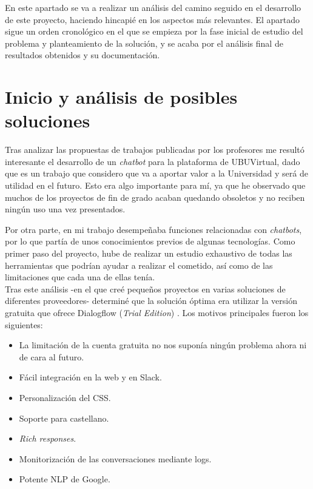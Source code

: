 
En este apartado se va a realizar un análisis del camino seguido en el desarrollo de este proyecto, haciendo hincapié en los aspectos más relevantes. El apartado sigue un orden cronológico en el que se empieza por la fase inicial de estudio del problema y planteamiento de la solución, y se acaba por el análisis final de resultados obtenidos y su documentación.

\section{Inicio y análisis de posibles soluciones}

Tras analizar las propuestas de trabajos publicadas por los profesores me resultó interesante el desarrollo de un \textit{chatbot} para la plataforma de UBUVirtual, dado que es un trabajo que considero que va a aportar valor a la Universidad y será de utilidad en el futuro. Esto era algo importante para mí, ya que he observado que muchos de los proyectos de fin de grado acaban quedando obsoletos y no reciben ningún uso una vez presentados.

Por otra parte, en mi trabajo desempeñaba funciones relacionadas con \textit{chatbots}, por lo que partía de unos conocimientos previos de algunas tecnologías. Como primer paso del proyecto, hube de realizar un estudio exhaustivo de todas las herramientas que podrían ayudar a realizar el cometido, así como de las limitaciones que cada una de ellas tenía.\\
Tras este análisis -en el que creé pequeños proyectos en varias soluciones de diferentes proveedores- determiné que la  solución óptima era utilizar la versión gratuita que ofrece Dialogflow (\textit{Trial Edition}) \cite{DialogflowTrial}. 
\newpage
Los motivos principales fueron los siguientes:
\begin{itemize}
	\tightlist
	\item
	La limitación de la cuenta gratuita no nos suponía ningún problema ahora ni de cara al futuro.
	\item 
	Fácil integración en la web y en Slack.
	\item 
	Personalización del CSS.
	\item 
	Soporte para castellano.
	\item 
	\textit{Rich responses}.
	\item 
	Monitorización de las conversaciones mediante logs.
	\item 
	Potente NLP de Google.
\end{itemize}

